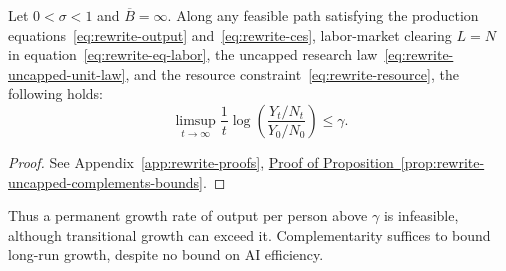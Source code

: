 \begin{proposition}
\label{prop:rewrite-uncapped-complements-bounds}
Let $0<\sigma<1$ and $\overline B=\infty$.
Along any feasible path satisfying the production equations~\eqref{eq:rewrite-output}
and~\eqref{eq:rewrite-ces}, labor-market clearing $L=N$ in
equation~\eqref{eq:rewrite-eq-labor}, the uncapped research law~\eqref{eq:rewrite-uncapped-unit-law},
and the resource constraint~\eqref{eq:rewrite-resource}, the following holds:
\begin{equation}
 \limsup_{t\to\infty}\frac1t
 \log\left(\frac{Y_t/N_t}{Y_0/N_0}\right)\leq\gamma.
 \label{eq:rewrite-uncapped-complements-growth-bound}
\end{equation}
\end{proposition}
\begin{proof}
See Appendix~\ref{app:rewrite-proofs},
\hyperref[proof:rewrite-uncapped-complements-bounds]{Proof of
Proposition~\ref*{prop:rewrite-uncapped-complements-bounds}}.
\end{proof}

Thus a permanent growth rate of output per person above $\gamma$ is infeasible, although transitional growth can exceed it. %
Complementarity suffices to bound long-run growth, despite no bound on AI efficiency.


